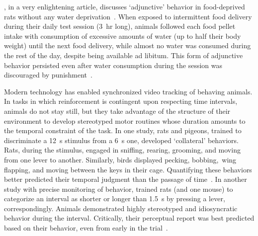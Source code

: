 , in a very enlightening article, discusses `adjunctive' behavior in food-deprived rats without any water deprivation~\cite{Falk1971}.
When exposed to intermittent food delivery during their daily test session (3~hr long), animals followed each food pellet intake with consumption of excessive amounts of water (up to half their body weight) until the next food delivery, while almost no water was consumed during the rest of the day, despite being available ad libitum.
This form of adjunctive behavior persisted even after water consumption during the session was discouraged by punishment~\cite{Falk1971}.\footnotemark
{}
\par
Modern technology has enabled synchronized video tracking of behaving animals.
In tasks in which reinforcement is contingent upon respecting time intervals, animals do not stay still, but they take advantage of the structure of their environment to develop stereotyped motor routines whose duration amounts to the temporal constraint of the task.
In one study, rats and pigeons, trained to discriminate a 12~s stimulus from a 6~s one, developed `collateral' behaviors.
Rats, during the stimulus, engaged in sniffing, rearing, grooming, and moving from one lever to another.
Similarly, birds displayed pecking, bobbing,\footnotemark\ wing flapping, and moving between the keys in their cage.
Quantifying these behaviors better predicted their temporal judgment than the passage of time~\cite{Fetterman1998BehProc}.
In another study with precise monitoring of behavior, \citeauthor{Gouvea2014} trained rats (and one mouse) to categorize an interval as shorter or longer than 1.5~s by pressing a lever, correspondingly.
Animals demonstrated highly stereotyped and idiosyncratic behavior during the interval.
Critically, their perceptual report was best predicted based on their behavior, even from early in the trial~\cite{Gouvea2014}.
